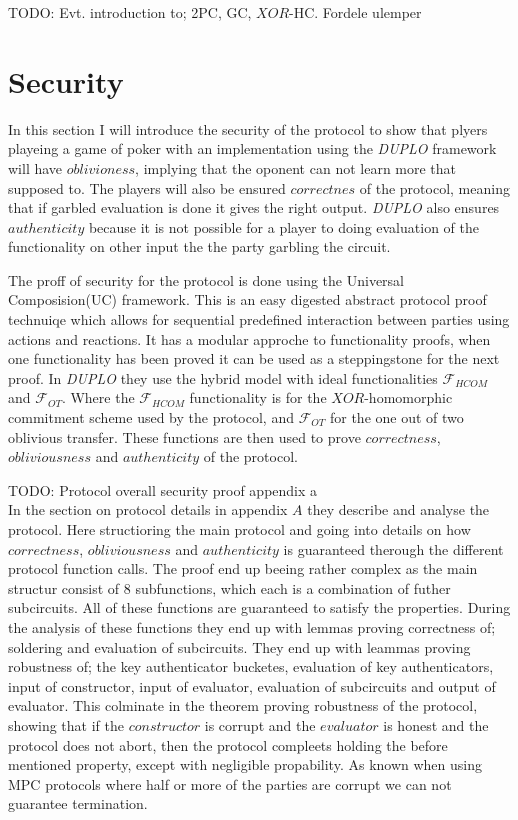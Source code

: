 \documentclass[twoside,11pt,openright]{report}
\newcommand{\todo}[1]{}
\renewcommand{\todo}[1]{{\color{red} TODO: {#1}} \\}
\newcommand{\DUPLO}{\textit{DUPLO} }
\begin{document}
\todo{Evt. introduction to; 2PC, GC, $XOR$-HC. Fordele ulemper}

\section{Security}
\label{sec:duplo_secutity}
In this section I will introduce the security of the protocol to show that plyers playeing a game of poker with an implementation using the \DUPLO framework will have $oblivioness$, implying that the oponent can not learn more that supposed to. The players will also be ensured $correctnes$ of the protocol, meaning that if garbled evaluation is done it gives the right output. \DUPLO also ensures $authenticity$ because it is not possible for a player to doing evaluation of the functionality on other input the the party garbling the circuit.

\bigskip

The proff of security for the protocol is done using the Universal Composision(UC) framework. This is an easy digested abstract protocol proof technuiqe which allows for sequential predefined interaction between parties using actions and reactions. It has a modular approche to functionality proofs, when one functionality has been proved it can be used as a steppingstone for the next proof. In \DUPLO they use the hybrid model with ideal functionalities $\mathcal{F}_{HCOM}$ and $\mathcal{F}_{OT}$. Where the $\mathcal{F}_{HCOM}$ functionality is for the $XOR$-homomorphic commitment scheme used by the protocol, and $\mathcal{F}_{OT}$ for the one out of two oblivious transfer. These functions are then used to prove $correctness$, $obliviousness$ and $authenticity$ of the protocol. 

\todo{Protocol overall security proof appendix a}
In the section on protocol details in  appendix $A$ they describe and analyse the protocol. Here structioring the main protocol and going into details on how $correctness$, $obliviousness$ and $authenticity$ is guaranteed therough the different protocol function calls. The proof end up beeing rather complex as the main structur consist of $8$ subfunctions, which each is a combination of futher subcircuits. All of these functions are guaranteed to satisfy the properties. During the analysis of these functions they end up with lemmas proving correctness of; soldering and evaluation of subcircuits. They end up with leammas proving robustness of; the key authenticator bucketes, evaluation of key authenticators, input of constructor, input of evaluator, evaluation of subcircuits and output of evaluator. This colminate in the theorem proving robustness of the protocol, showing that if the $constructor$ is corrupt and the $evaluator$ is honest and the protocol does not abort, then the protocol compleets holding the before mentioned property, except with negligible propability. As known when using MPC protocols where half or more of the parties are corrupt we can not guarantee termination.
\end{document}
